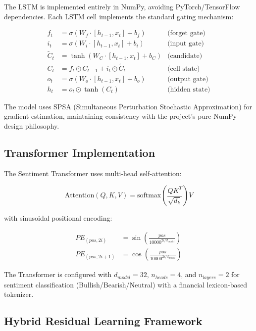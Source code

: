 \documentclass[12pt,a4paper]{report}
\begin{document}
The LSTM is implemented entirely in NumPy, avoiding PyTorch/TensorFlow dependencies. Each LSTM cell implements the standard gating mechanism:

\begin{align}
    f_t &= \sigma(W_f \cdot [h_{t-1}, x_t] + b_f) & \text{(forget gate)} \\
    i_t &= \sigma(W_i \cdot [h_{t-1}, x_t] + b_i) & \text{(input gate)} \\
    \tilde{C}_t &= \tanh(W_C \cdot [h_{t-1}, x_t] + b_C) & \text{(candidate)} \\
    C_t &= f_t \odot C_{t-1} + i_t \odot \tilde{C}_t & \text{(cell state)} \\
    o_t &= \sigma(W_o \cdot [h_{t-1}, x_t] + b_o) & \text{(output gate)} \\
    h_t &= o_t \odot \tanh(C_t) & \text{(hidden state)}
\end{align}

The model uses SPSA (Simultaneous Perturbation Stochastic Approximation) for gradient estimation, maintaining consistency with the project's pure-NumPy design philosophy.

\subsection{Transformer Implementation}

The Sentiment Transformer uses multi-head self-attention:

\begin{equation}
    \text{Attention}(Q, K, V) = \text{softmax}\left(\frac{QK^T}{\sqrt{d_k}}\right)V
\end{equation}

with sinusoidal positional encoding:

\begin{align}
    PE_{(pos, 2i)} &= \sin\left(\frac{pos}{10000^{2i/d_{model}}}\right) \\
    PE_{(pos, 2i+1)} &= \cos\left(\frac{pos}{10000^{2i/d_{model}}}\right)
\end{align}

The Transformer is configured with $d_{model}=32$, $n_{heads}=4$, and $n_{layers}=2$ for sentiment classification (Bullish/Bearish/Neutral) with a financial lexicon-based tokenizer.

\subsection{Hybrid Residual Learning Framework}
\end{document}
